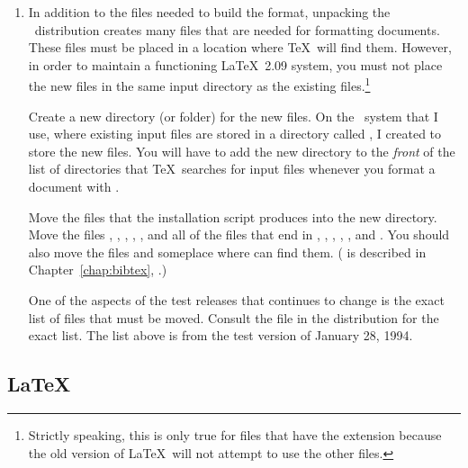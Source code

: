 \begin{enumerate}
   Move the resulting 
   files   and  into 
   the \TeX\ formats directory.

  \item In addition to the files needed to build the format, unpacking
    the \LaTeXe\ distribution creates many files that are needed for 
    formatting documents.
    These files must be placed in a location where \TeX\ will find them.
    However, in order to maintain a functioning \LaTeX\ 2.09 system,
    you must not place the new files in the same input directory as the
    existing files.\footnote{Strictly speaking, this is only true for files
    that have the extension  because the old version of 
    \LaTeX\ will not attempt to use the other files.}

    Create a new directory (or folder) for the new files.  On the
    \Unix\ system that I use, where existing input files are stored in a
    directory called , I created
     to store the new files.  You will
    have to add the new directory to the \emph{front} of the list of
    directories that \TeX\ searches for input files whenever you format a
    document with \LaTeXe.

    Move the files that the installation script produces into the new
    directory.  Move the files ,
    , , ,
    , and all of the files that end in ,
    , , , , and
    .  You should also move the files  and
     someplace where  can find them.
    ( is described in Chapter~\ref{chap:bibtex},
    \textit{}.)

    One of the aspects of the test releases that continues to change
    is the exact list of files that must be moved.  Consult the 
     file in the distribution for the exact
    list.  The list above is from the test version of January 28, 1994.
\end{enumerate}

\subsection{\protect\LaTeX}
\label{sec:latex}
\label{macpack:sec:latex}

